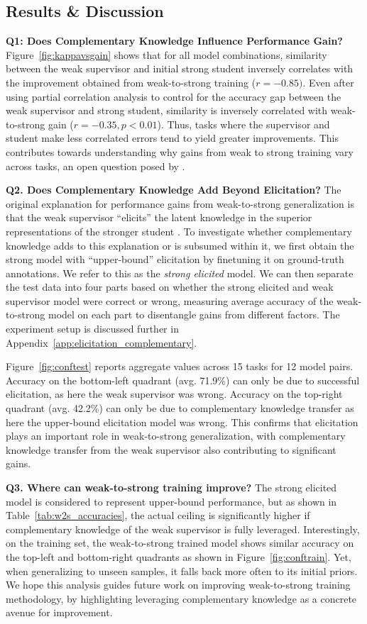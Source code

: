 \subsection{Results \& Discussion}


\textbf{Q1: Does Complementary Knowledge Influence Performance Gain?} Figure~\ref{fig:kappavsgain} shows that for all model combinations, similarity between the weak supervisor and initial strong student inversely correlates with the improvement obtained from weak-to-strong training ($r=-0.85)$. Even after using partial correlation analysis to control for the accuracy gap between the weak supervisor and strong student, similarity is inversely correlated with weak-to-strong gain ($r=-0.35, p < 0.01$). Thus, tasks where the supervisor and student make less correlated errors tend to yield greater improvements. This contributes towards understanding why gains from weak to strong training vary across tasks, an open question posed by \citet{burns2024weaktostrong}.

\textbf{Q2. Does Complementary Knowledge Add Beyond Elicitation?} The original explanation for performance gains from weak-to-strong generalization is that the weak supervisor ``elicits'' the latent knowledge in the superior representations of the stronger student \citep{burns2024weaktostrong}. To investigate whether complementary knowledge adds to this explanation or is subsumed within it, we first obtain the strong model with ``upper-bound'' elicitation by finetuning it on ground-truth annotations. We refer to this as the \textit{strong elicited} model. We can then separate the test data into four parts based on whether the strong elicited and weak supervisor model were correct or wrong, measuring average accuracy of the weak-to-strong model on each part to disentangle gains from different factors. The experiment setup is discussed further in Appendix~\ref{app:elicitation_complementary}.

Figure~\ref{fig:conftest} reports aggregate values across 15 tasks for 12 model pairs. Accuracy on the bottom-left quadrant (avg. 71.9\%) can only be due to successful elicitation, as here the weak supervisor was wrong. Accuracy on the top-right quadrant (avg. 42.2\%) can only be due to complementary knowledge transfer as here the upper-bound elicitation model was wrong. This confirms that elicitation plays an important role in weak-to-strong generalization, with complementary knowledge transfer from the weak supervisor also contributing to significant gains.

\textbf{Q3. Where can weak-to-strong training improve?} The strong elicited model is considered to represent upper-bound performance, but as shown in Table~\ref{tab:w2s_accuracies}, the actual ceiling is significantly higher if complementary knowledge of the weak supervisor is fully leveraged. Interestingly, on the training set, the weak-to-strong trained model shows similar accuracy on the top-left and bottom-right quadrants as shown in Figure~\ref{fig:conftrain}. Yet, when generalizing to unseen samples, it falls back more often to its initial priors. We hope this analysis guides future work on improving weak-to-strong training methodology, by highlighting leveraging complementary knowledge as a concrete avenue for improvement.
